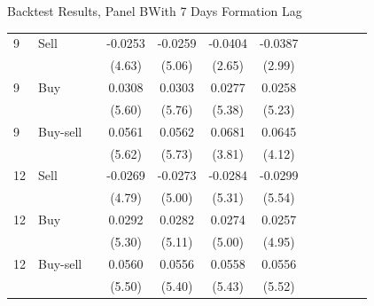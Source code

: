 \documentclass{beamer}
\begin{document}
\begin{frame}{Backtest Results, Panel B}{With 7 Days Formation Lag}
\begin{table}
\begin{tabular}{llrSSSScSSSS}
            9  & Sell     &    & -0.0253               & -0.0259               & -0.0404               & -0.0387                \\
               &          &    & (4.63)                & (5.06)                & (2.65)                & (2.99)                 \\
            9  & Buy      &    & 0.0308                & 0.0303                & 0.0277                & 0.0258                 \\
               &          &    & (5.60)                & (5.76)                & (5.38)                & (5.23)                 \\
            9  & Buy-sell &    & 0.0561                & 0.0562                & 0.0681                & 0.0645                 \\
               &          &    & (5.62)                & (5.73)                & (3.81)                & (4.12)                 \\
            12 & Sell     &    & -0.0269               & -0.0273               & -0.0284               & -0.0299                \\
               &          &    & (4.79)                & (5.00)                & (5.31)                & (5.54)                 \\
            12 & Buy      &    & 0.0292                & 0.0282                & 0.0274                & 0.0257                 \\
               &          &    & (5.30)                & (5.11)                & (5.00)                & (4.95)                 \\
            12 & Buy-sell &    & 0.0560                & 0.0556                & 0.0558                & 0.0556                 \\
               &          &    & (5.50)                & (5.40)                & (5.43)                & (5.52)                 \\
            \bottomrule
        \end{tabular}
    \end{table}
\end{frame}
\end{document}
